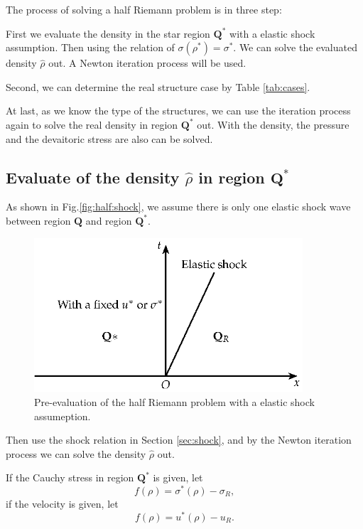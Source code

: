 \documentclass[review]{elsarticle}
\begin{document}
The process of solving a half Riemann problem is in three step:

First we  evaluate the density in the star region $\mathbf{Q}^*$ with a  elastic shock assumption.  Then using the relation of $\sigma(\rho^*) = \sigma^*$. We can solve the evaluated density $\hat{\rho}$ out. A  Newton iteration process will be used.

Second, we can determine the real structure  case by Table \ref{tab:cases}. 

At last, as we know the type of the structures, we can use the  iteration process again to solve the real density in region $\mathbf{Q}^*$ out. With the density, the pressure and the devaitoric stress are also can be solved. 

\subsection{Evaluate of the density $\hat{\rho}$ in region $\mathbf{Q}^*$ }
As shown in Fig.\ref{fig:half:shock}, we  assume there is only one elastic shock wave between region $\mathbf{Q}$ and region $\mathbf{Q}^*$.

\begin{figure}
  \centering
  \includegraphics[width= 10cm] {Tikz-figure9.eps}
  \caption{Pre-evaluation of the half Riemann problem  with a elastic shock assumeption.}
  \label{fig:half}
\end{figure}
Then use the shock relation in Section \ref{sec:shock}, and  by the Newton   iteration process we can solve the density $\hat{\rho}$ out. 

If the Cauchy stress  in region $\mathbf{Q}^*$ is given, let
\begin{equation}
  f(\rho) = \sigma^*(\rho) -\sigma_R,
\end{equation}
if the velocity is given, let
\begin{equation}
  f(\rho) = u^*(\rho) -u_R.
\end{equation}
\end{document}
